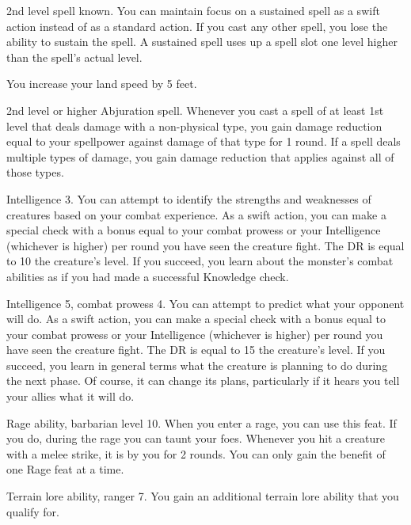 \featpre 2nd level spell known.
\featben You can maintain focus on a sustained spell as a swift action instead of as a standard action.
If you cast any other spell, you lose the ability to sustain the spell.
A sustained spell uses up a spell slot one level higher than the spell's actual level.

\featben You increase your land speed by 5 feet.

\featpre 2nd level or higher Abjuration spell.
\featben Whenever you cast a spell of at least 1st level that deals damage with a non-physical type, you gain damage reduction equal to your spellpower against damage of that type for 1 round.
If a spell deals multiple types of damage, you gain damage reduction that applies against all of those types.

\featpre Intelligence 3.
\featben You can attempt to identify the strengths and weaknesses of creatures based on your combat experience.
As a swift action, you can make a special check with a bonus equal to your combat prowess or your Intelligence (whichever is higher)  per round you have seen the creature fight.
The DR is equal to 10 \add the creature's level.
If you succeed, you learn about the monster's combat abilities as if you had made a successful Knowledge check.

\featpres Intelligence 5, combat prowess 4.
\featben You can attempt to predict what your opponent will do.
As a swift action, you can make a special check with a bonus equal to your combat prowess or your Intelligence (whichever is higher)  per round you have seen the creature fight.
The DR is equal to 15 \add the creature's level.
If you succeed, you learn in general terms what the creature is planning to do during the next phase.
Of course, it can change its plans, particularly if it hears you tell your allies what it will do.

\featpres Rage ability, barbarian level 10.
\featben When you enter a rage, you can use this feat. If you do, during the rage you can taunt your foes.
Whenever you hit a creature with a melee strike, it is \taunted by you for 2 rounds.
 You can only gain the benefit of one Rage feat at a time.

\featpres Terrain lore ability, ranger 7.
\featben You gain an additional terrain lore ability that you qualify for.

